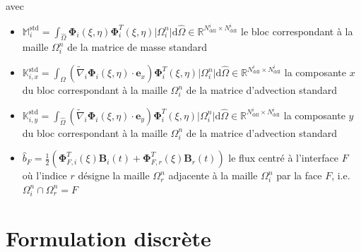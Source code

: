 \documentclass[11pt, a4paper, oneside]{report}
\begin{document}
avec
\begin{itemize}
    \item $\displaystyle \mathbb{M}_i^\text{std} = \int_{\widehat{\Omega}} \bm{\Phi}_i(\xi, \eta) \bm{\Phi}_i^T(\xi, \eta) \lvert \Omega_i^n \rvert \text{d}\widehat{\Omega} \in \mathbb{R}^{N_\text{ddl}^i \times N_\text{ddl}^i}$ le bloc correspondant à la maille $\Omega_i^n$ de la matrice de masse standard
    \item $\displaystyle \mathbb{K}_{i, x}^\text{std} = \int_{\widehat{\Omega}} \left( \widetilde{\nabla}_i \bm{\Phi}_i(\xi, \eta) \cdot \bm{e}_x \right) \bm{\Phi}_i^T(\xi, \eta) \lvert \Omega_i^n \rvert \text{d}\widehat{\Omega} \in \mathbb{R}^{N_\text{ddl}^i \times N_\text{ddl}^i}$ la composante $x$ du bloc correspondant à la maille $\Omega_i^n$ de la matrice d'advection standard
    \item $\displaystyle \mathbb{K}_{i, y}^\text{std} = \int_{\widehat{\Omega}} \left( \widetilde{\nabla}_i \bm{\Phi}_i(\xi, \eta) \cdot \bm{e}_y \right) \bm{\Phi}_i^T(\xi, \eta) \lvert \Omega_i^n \rvert \text{d}\widehat{\Omega} \in \mathbb{R}^{N_\text{ddl}^i \times N_\text{ddl}^i}$ la composante $y$ du bloc correspondant à la maille $\Omega_i^n$ de la matrice d'advection standard
    \item $\displaystyle \widehat{b}_F = \frac{1}{2} \left( \bm{\Phi}_{F, i}^T(\xi) \bm{B}_i(t) + \bm{\Phi}_{F, r}^T(\xi) \bm{B}_r(t) \right)$ le flux centré à l'interface $F$ où l'indice $r$ désigne la maille $\Omega_r^n$ adjacente à la maille $\Omega_i^n$ par la face $F$, i.e. $\Omega_i^n \cap \Omega_r^n = F$
\end{itemize}

\section{Formulation discrète}
\enlargethispage{1\baselineskip}
\end{document}
